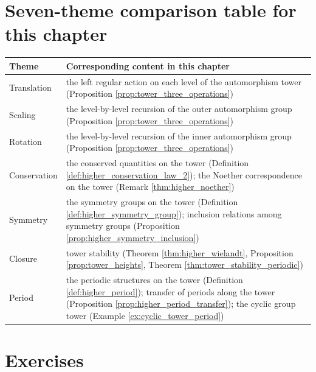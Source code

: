 \section*{Seven-theme comparison table for this chapter}

\begin{center}
\renewcommand{\arraystretch}{1.3}
\begin{tabular}{>{\raggedright\arraybackslash}p{2.8cm}>{\raggedright\arraybackslash}p{9.9cm}}
\toprule
Theme & Corresponding content in this chapter \\
\midrule
Translation & the left regular action on each level of the automorphism tower (Proposition \ref{prop:tower_three_operations}) \\
Scaling & the level-by-level recursion of the outer automorphism group (Proposition \ref{prop:tower_three_operations}) \\
Rotation & the level-by-level recursion of the inner automorphism group (Proposition \ref{prop:tower_three_operations}) \\
Conservation & the conserved quantities on the tower (Definition \ref{def:higher_conservation_law_2}); the Noether correspondence on the tower (Remark \ref{thm:higher_noether}) \\
Symmetry & the symmetry groups on the tower (Definition \ref{def:higher_symmetry_group}); inclusion relations among symmetry groups (Proposition \ref{prop:higher_symmetry_inclusion}) \\
Closure & tower stability (Theorem \ref{thm:higher_wielandt}, Proposition \ref{prop:tower_heights}, Theorem \ref{thm:tower_stability_periodic}) \\
Period & the periodic structures on the tower (Definition \ref{def:higher_period}); transfer of periods along the tower (Proposition \ref{prop:higher_period_transfer}); the cyclic group tower (Example \ref{ex:cyclic_tower_period}) \\
\bottomrule
\end{tabular}
\end{center}

\section*{Exercises}


